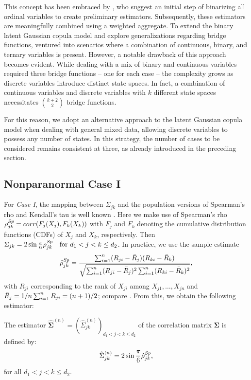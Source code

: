 This concept has been embraced by \citet{Feng19}, who suggest an initial step of binarizing all ordinal variables to create preliminary estimators. Subsequently, these estimators are meaningfully combined using a weighted aggregate. To extend the binary latent Gaussian copula model and explore generalizations regarding bridge functions, \citet{Quan18} ventured into scenarios where a combination of continuous, binary, and ternary variables is present. However, a notable drawback of this approach becomes evident. While dealing with a mix of binary and continuous variables required three bridge functions -- one for each case -- the complexity grows as discrete variables introduce distinct state spaces. In fact, a combination of continuous variables and discrete variables with $k$ different state spaces necessitates $\binom{k+2}{2}$ bridge functions.

For this reason, we adopt an alternative approach to the latent Gaussian copula model when dealing with general mixed data, allowing discrete variables to possess any number of states. In this strategy, the number of cases to be considered remains consistent at three, as already introduced in the preceding section.

\subsection{Nonparanormal Case I}\label{sec::nonparanormal_case1}

For \textit{Case I}, the mapping between $\Sigma_{jk}$ and the population versions of Spearman's rho and Kendall's tau is well known \citep{Liu09}. Here we make use of Spearman's rho $\rho^{\text{\textit{Sp}}}_{jk} = corr(F_j(X_j),F_k(X_k))$ with $F_j$ and $F_k$ denoting the cumulative distribution functions (CDFs) of $X_j$ and $X_k$, respectively. Then $\Sigma_{jk} = 2\sin{\frac{\pi}{6} \rho^{\text{\textit{Sp}}}_{jk}} \quad \text{for } d_1  < j < k \leq d_2$. In practice, we use the sample estimate
\begin{equation*}
    \hat{\rho}^{\text{\textit{Sp}}}_{jk} = \frac{\sum_{i=1}^n (R_{ji} - \Bar{R}_{j}) (R_{ki} - \Bar{R}_{k})}{\sqrt{\sum_{i=1}^n(R_{ji} - \Bar{R}_{j})^2\sum_{i=1}^n(R_{ki} - \Bar{R}_{k})^2}},
\end{equation*}
with $R_{ji}$ corresponding to the rank of $X_{ji}$ among $X_{j1}, \dots, X_{jn}$ and $\Bar{R}_{j} = 1/n \sum_{i=1}^n R_{ji} = (n+1)/2$; compare \cite{Liu12}. From this, we obtain the following estimator:
\begin{definition}\label{case1_nonpara}
    The estimator $\hat{\mathbf{\Sigma}}^{(n)} = (\hat{\Sigma}_{jk}^{(n)})_{d_1 < j< k\leq d_2}$ of the correlation matrix $\mathbf{\Sigma}$ is defined by:
    \begin{equation}
            \hat{\Sigma}_{jk}^{(n)} = 2\sin{\frac{\pi}{6} \hat{\rho}^{\text{\textit{Sp}}}_{jk}},
    \end{equation}
    for all $d_1 < j < k \leq d_2$.
\end{definition}

